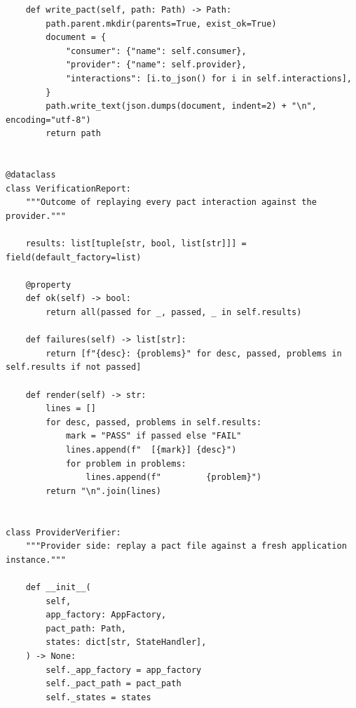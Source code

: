 \begin{verbatim}
    def write_pact(self, path: Path) -> Path:
        path.parent.mkdir(parents=True, exist_ok=True)
        document = {
            "consumer": {"name": self.consumer},
            "provider": {"name": self.provider},
            "interactions": [i.to_json() for i in self.interactions],
        }
        path.write_text(json.dumps(document, indent=2) + "\n", encoding="utf-8")
        return path


@dataclass
class VerificationReport:
    """Outcome of replaying every pact interaction against the provider."""

    results: list[tuple[str, bool, list[str]]] = field(default_factory=list)

    @property
    def ok(self) -> bool:
        return all(passed for _, passed, _ in self.results)

    def failures(self) -> list[str]:
        return [f"{desc}: {problems}" for desc, passed, problems in self.results if not passed]

    def render(self) -> str:
        lines = []
        for desc, passed, problems in self.results:
            mark = "PASS" if passed else "FAIL"
            lines.append(f"  [{mark}] {desc}")
            for problem in problems:
                lines.append(f"         {problem}")
        return "\n".join(lines)


class ProviderVerifier:
    """Provider side: replay a pact file against a fresh application instance."""

    def __init__(
        self,
        app_factory: AppFactory,
        pact_path: Path,
        states: dict[str, StateHandler],
    ) -> None:
        self._app_factory = app_factory
        self._pact_path = pact_path
        self._states = states


\end{verbatim}
